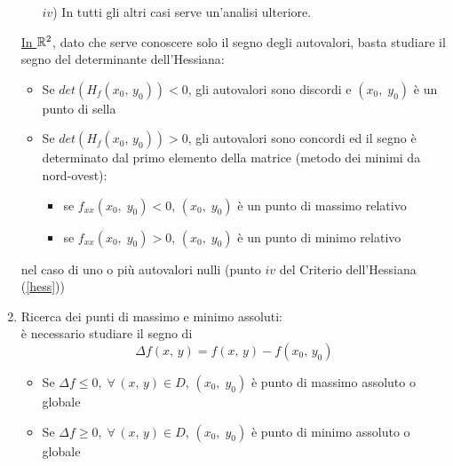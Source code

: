 \begin{enumerate}
\begin{theorem}
\begin{itemize}
\begin{center}
            \end{center}
            \item [$iv$)] In tutti gli altri casi serve un'analisi ulteriore.
        \end{itemize}
        \label{hess}
    \end{theorem}

    \underline{In $\mathbb{R}^2$}, dato che serve conoscere solo il segno degli autovalori, basta studiare il segno del determinante dell'Hessiana:
    \begin{itemize}[topsep=0pt]
        \item Se $det(H_f (x_0,\, y_0)) < 0$, gli autovalori sono discordi e $(x_0, \; y_0)$ è un punto di sella 
        \item Se $det(H_f (x_0,\, y_0)) > 0$, gli autovalori sono concordi ed il segno è determinato dal primo elemento della matrice (metodo dei minimi da nord-ovest):
        \begin{itemize}[topsep=0pt]
            \item se $f_{xx} (x_0, \; y_0) < 0$, $(x_0, \; y_0)$ è un punto di massimo relativo
            \item se $f_{xx} (x_0, \; y_0) > 0$, $(x_0, \; y_0)$ è un punto di minimo relativo
        \end{itemize}
    \end{itemize}

    nel caso di uno o più autovalori nulli (punto $iv$ del Criterio dell'Hessiana (\ref{hess}))

    \item Ricerca dei punti di massimo e minimo assoluti:\\
    è necessario studiare il segno di
    \begin{equation}
        \Delta f(x, \, y) = f(x,\, y) - f(x_0, \, y_0)
    \end{equation}
    \begin{itemize}
        \item Se $\Delta f \leq 0, \; \forall\, (x, \, y) \in D$, $(x_0, \; y_0)$ è punto di massimo assoluto o globale
        \item Se $\Delta f \geq 0, \; \forall\, (x, \, y) \in D$, $(x_0, \; y_0)$ è punto di minimo assoluto o globale
    \end{itemize}
\end{enumerate}
